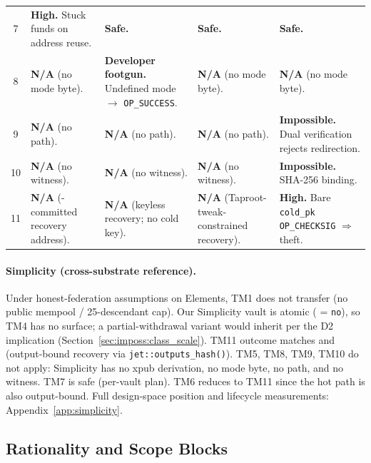 \begin{table}[h]
\begin{tabular}{@{}cp{2.6cm}p{2.6cm}p{2.6cm}p{2.6cm}@{}}
7 & \textbf{High.} Stuck funds on address reuse.
  & \textbf{Safe.}
  & \textbf{Safe.}
  & \textbf{Safe.} \\[4pt]

8 & \textbf{N/A} (no mode byte).
  & \textbf{Developer footgun.} Undefined mode $\rightarrow$ \texttt{OP\_SUCCESS}.
  & \textbf{N/A} (no mode byte).
  & \textbf{N/A} (no mode byte). \\[4pt]

9 & \textbf{N/A} (no \opcsfs{} path).
  & \textbf{N/A} (no \opcsfs{} path).
  & \textbf{N/A} (no \opcsfs{} path).
  & \textbf{Impossible.} Dual verification rejects redirection. \\[4pt]

10 & \textbf{N/A} (no \opcsfs{} witness).
   & \textbf{N/A} (no \opcsfs{} witness).
   & \textbf{N/A} (no \opcsfs{} witness).
   & \textbf{Impossible.} SHA-256 binding. \\[4pt]

11 & \textbf{N/A} (\opctv{}-committed recovery address).
   & \textbf{N/A} (keyless recovery; no cold key).
   & \textbf{N/A} (Taproot-tweak-constrained recovery).
   & \textbf{High.} Bare \texttt{cold\_pk OP\_CHECKSIG} $\Rightarrow$ theft. \\
\bottomrule
\end{tabular}
\end{table}

\paragraph{Simplicity (cross-substrate reference).}
Under honest-federation assumptions on Elements, TM1 does not
transfer (no public mempool / 25-descendant cap). Our Simplicity
vault is atomic (\axrevault{} = \texttt{no}), so TM4 has no surface;
a partial-withdrawal variant would inherit \classscale{} per the D2
implication (Section~\ref{sec:imposs:class_scale}). TM11 outcome
matches \opctv{} and \opvault{} (output-bound recovery via
\texttt{jet::outputs\_hash()}). TM5, TM8, TM9, TM10 do not apply:
Simplicity has no xpub derivation, no mode byte, no \opcsfs{} path,
and no \opcsfs{} witness. TM7 is safe (per-vault plan). TM6 reduces
to TM11 since the hot path is also output-bound. Full design-space
position and lifecycle measurements:
Appendix~\ref{app:simplicity}.

\subsection{Rationality and Scope Blocks}
\label{app:rationality}

